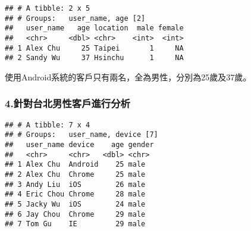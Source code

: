 \documentclass[]{article}
\newenvironment{Shaded}{\begin{snugshade}}{\end{snugshade}}
\newcommand{\DataTypeTok}[1]{\textcolor[rgb]{0.13,0.29,0.53}{#1}}
\newcommand{\DecValTok}[1]{\textcolor[rgb]{0.00,0.00,0.81}{#1}}
\newcommand{\KeywordTok}[1]{\textcolor[rgb]{0.13,0.29,0.53}{\textbf{#1}}}
\newcommand{\NormalTok}[1]{#1}
\newcommand{\OperatorTok}[1]{\textcolor[rgb]{0.81,0.36,0.00}{\textbf{#1}}}
\newcommand{\StringTok}[1]{\textcolor[rgb]{0.31,0.60,0.02}{#1}}
\begin{document}
\begin{Shaded}
\end{Shaded}

\begin{verbatim}
## # A tibble: 2 x 5
## # Groups:   user_name, age [2]
##   user_name   age location  male female
##   <chr>     <dbl> <chr>    <int>  <int>
## 1 Alex Chu     25 Taipei       1     NA
## 2 Sandy Wu     37 Hsinchu      1     NA
\end{verbatim}

使用Android系統的客戶只有兩名，全為男性，分別為25歲及37歲。

\hypertarget{ux91ddux5c0dux53f0ux5317ux7537ux6027ux5ba2ux6236ux9032ux884cux5206ux6790}{%
\subsubsection{\texorpdfstring{\textbf{4.針對台北男性客戶進行分析}}{4.針對台北男性客戶進行分析}}\label{ux91ddux5c0dux53f0ux5317ux7537ux6027ux5ba2ux6236ux9032ux884cux5206ux6790}}

\begin{Shaded}
\end{Shaded}

\begin{verbatim}
## # A tibble: 7 x 4
## # Groups:   user_name, device [7]
##   user_name device    age gender
##   <chr>     <chr>   <dbl> <chr> 
## 1 Alex Chu  Android    25 male  
## 2 Alex Chu  Chrome     25 male  
## 3 Andy Liu  iOS        26 male  
## 4 Eric Chou Chrome     28 male  
## 5 Jacky Wu  iOS        24 male  
## 6 Jay Chou  Chrome     29 male  
## 7 Tom Gu    IE         29 male
\end{verbatim}
\end{document}
